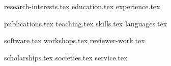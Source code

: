 \documentclass[letterpaper,11pt]{article}
\begin{document}


{research-interests.tex}
{education.tex}
{experience.tex}

\pagebreak

{publications.tex}
{teaching.tex}
\sidebyside
    {{skills.tex}}
    {{languages.tex}}

\pagebreak

{software.tex}
{workshops.tex}
{reviewer-work.tex}

\pagebreak

{scholarships.tex}
{societies.tex}
{service.tex}
\end{document}
